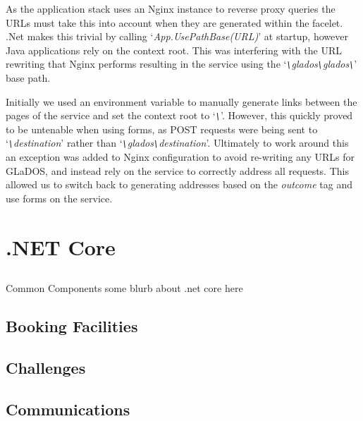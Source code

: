        \par
        As the application stack uses an Nginx instance to reverse proxy queries the URLs must take this into account when they are generated within the facelet. .Net makes this trivial by calling `\textit{App.UsePathBase(URL)}' at startup, however Java applications rely on the context root. This was interfering with the URL rewriting that Nginx performs resulting in the service using the 
        `\textit{\texttt{\textbackslash}glados\texttt{\textbackslash}glados\texttt{\textbackslash}}' base path.

        \par
        Initially we used an environment variable to manually generate links between the pages of the service and set the context root to 
        `\textit{\texttt{\textbackslash}}'. However, this quickly proved to be untenable when using forms, as POST requests were being sent to 
        `\textit{\texttt{\textbackslash}destination}' 
        rather than 
        `\textit{\texttt{\textbackslash}glados\texttt{\textbackslash}destination}'. Ultimately to work around this an exception was added to Nginx configuration to avoid re-writing any URLs for GLaDOS, and instead rely on the service to correctly address all requests. This allowed us to switch back to generating addresses based on the \textit{outcome} tag and use forms on the service.



\section{.NET Core}
    \subsection{}{Common Components}
some blurb about .net core here

    \subsection{Booking Facilities}

    \subsection{Challenges}

    \subsection{Communications}

